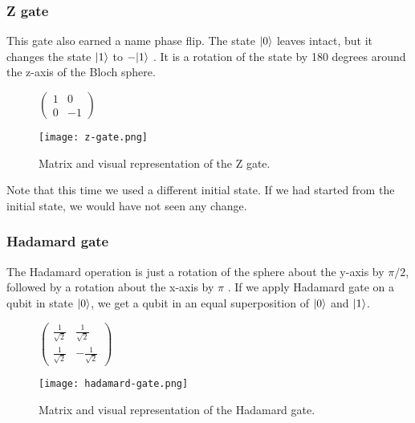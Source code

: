 
\subsubsection{Z gate}
This gate also earned a name phase flip. The state $\lvert0\rangle$ leaves intact, but it changes the state $\lvert1\rangle$ to $-\lvert1\rangle$ \cite{qc}. It is a rotation of the state by 180 degrees around the z-axis of the Bloch sphere.
\begin{figure}[H]
    \centering
    \begin{minipage}{0.4\linewidth}
      \centering
      $\begin{pmatrix}
        1 & 0 \\
        0 & -1
        \end{pmatrix}$
      \vfill
    \end{minipage}
    \begin{minipage}{0.25\linewidth}
      \centering
      \texttt{[image: z-gate.png]}
      \vfill
    \end{minipage}
    \caption{Matrix and visual representation of the Z gate.}
\end{figure}

Note that this time we used a different initial state. If we had started from the initial state, we would have not seen any change.

\subsubsection{Hadamard gate}
The Hadamard operation is just a rotation of the sphere about the y-axis by $\pi/2$, followed by a rotation about the x-axis by $\pi$ \cite{qc}. If we apply Hadamard gate on a qubit in state $\lvert0\rangle$, we get a qubit in an equal superposition of $\lvert0\rangle$ and $\lvert1\rangle$.
\begin{figure}[H]
    \centering
    \begin{minipage}{0.4\linewidth}
      \centering
      $\begin{pmatrix} 
        \frac{1}{\sqrt{2}} &  \frac{1}{\sqrt{2}}  \\
        \frac{1}{\sqrt{2}}  &  -\frac{1}{\sqrt{2}} 
        \end{pmatrix}$
      \vfill
    \end{minipage}
    \begin{minipage}{0.25\linewidth}
      \centering
      \texttt{[image: hadamard-gate.png]}
      \vfill
    \end{minipage}
    \caption{Matrix and visual representation of the Hadamard gate.}
\end{figure}

